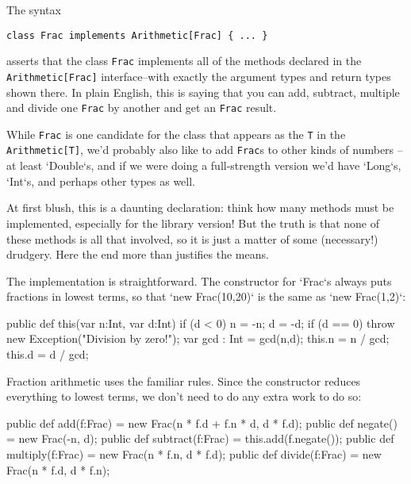 The syntax 
\begin{verbatim}
class Frac implements Arithmetic[Frac] { ... }
\end{verbatim}
asserts that the class {\tt Frac} implements all of the methods 
declared in the {\tt Arith\-me\-tic[Frac]} interface--with exactly the 
argument types and return types shown there.
In plain English, this is saying that you can add, subtract, multiple and divide one
{\tt Frac} by another and get an {\tt Frac} result.


While {\tt Frac} is one candidate for the class that
appears as the {\tt T} in the {\tt Arithmetic[T]}, we'd probably also like to
add {\tt Frac}s to other kinds of numbers -- at least \xcd`Double`s, and if we
were doing a full-strength version we'd have \xcd`Long`s, \xcd`Int`s, and
perhaps other types as well.  


\begin{xtennum}[]
class Frac implements Arithmetic[Frac], 
                      Arithmetic[Double] 
{
\end{xtennum}



At first blush, this is a daunting declaration: think how many methods must be
implemented, especially for the library version!
But the truth is that none of these methods is all that involved, so it is just a matter of
some (necessary!) drudgery.  Here the end more than justifies the means.

The implementation is straightforward.  The constructor for
\xcd`Frac`s always puts fractions in lowest terms, so that 
\xcd`new Frac(10,20)` is the same as  \xcd`new Frac(1,2)`: 

\begin{xtennum}[]
public def this(var n:Int, var d:Int) {
  if (d < 0) { n = -n; d = -d; }
  if (d == 0) throw new Exception("Division by zero!");
  var gcd : Int = gcd(n,d);
  this.n = n / gcd;
  this.d = d / gcd;
}
\end{xtennum}

Fraction arithmetic uses the familiar rules.  Since the constructor reduces
everything to lowest terms, we don't need to do any extra work to do so: 

\begin{xtennum}[]

public def add(f:Frac) = new Frac(n * f.d + f.n * d, d * f.d);
public def negate() = new Frac(-n, d);
public def subtract(f:Frac) = this.add(f.negate());
public def multiply(f:Frac) = new Frac(n * f.n, d * f.d);
public def divide(f:Frac) = new Frac(n * f.d, d * f.n);  

\end{xtennum}

